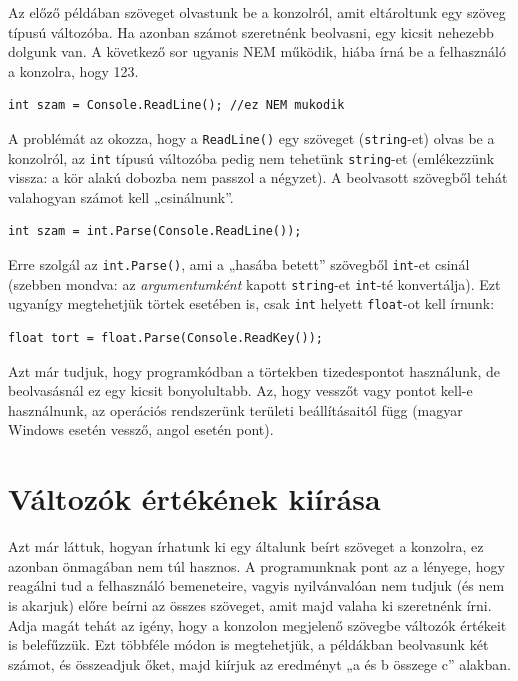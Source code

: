 \documentclass[a4paper]{article}
\begin{document}
Az előző példában szöveget olvastunk be a konzolról, amit eltároltunk egy szöveg típusú változóba. Ha azonban számot szeretnénk beolvasni, egy kicsit nehezebb dolgunk van. A következő sor ugyanis NEM működik, hiába írná be a felhasználó a konzolra, hogy 123.

\begin{lstlisting}[caption=Hibás beolvasás, label=lst:readWrong]
int szam = Console.ReadLine(); //ez NEM mukodik
\end{lstlisting}

A problémát az okozza, hogy a \lstinline{ReadLine()} egy szöveget (\lstinline{string}-et) olvas be a konzolról, az \lstinline{int} típusú változóba pedig nem tehetünk \lstinline{string}-et (emlékezzünk vissza: a kör alakú dobozba nem passzol a négyzet). A beolvasott szövegből tehát valahogyan számot kell „csinálnunk”.

\begin{lstlisting}[caption=Egész szám beolvasása, label=lst:readIntParse]
int szam = int.Parse(Console.ReadLine());
\end{lstlisting}


Erre szolgál az \lstinline{int.Parse()}, ami a „hasába betett” szövegből \lstinline{int}-et csinál (szebben mondva: az \emph{argumentumként} kapott \lstinline{string}-et \lstinline{int}-té konvertálja). Ezt ugyanígy megtehetjük törtek esetében is, csak \lstinline{int} helyett \lstinline{float}-ot kell írnunk:

\begin{lstlisting}[caption=Törtszám beolvasása, label=lst:readFloatParse]
float tort = float.Parse(Console.ReadKey());
\end{lstlisting}

Azt már tudjuk, hogy programkódban a törtekben tizedespontot használunk, de beolvasásnál ez egy kicsit bonyolultabb. Az, hogy vesszőt vagy pontot kell-e használnunk, az operációs rendszerünk területi beállításaitól függ (magyar Windows esetén vessző, angol esetén pont).

\section{Változók értékének kiírása}
Azt már láttuk, hogyan írhatunk ki egy általunk beírt szöveget a konzolra, ez azonban önmagában nem túl hasznos. A programunknak pont az a lényege, hogy reagálni tud a felhasználó bemeneteire, vagyis nyilvánvalóan nem tudjuk (és nem is akarjuk) előre beírni az összes szöveget, amit majd valaha ki szeretnénk írni. Adja magát tehát az igény, hogy a konzolon megjelenő szövegbe változók értékeit is belefűzzük. Ezt többféle módon is megtehetjük, a példákban beolvasunk két számot, és összeadjuk őket, majd kiírjuk az eredményt „a és b összege c” alakban.
\end{document}
